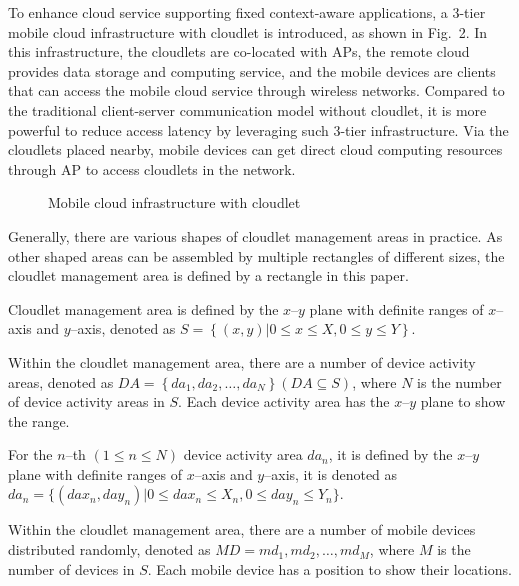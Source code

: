 \documentclass{llncs}
\begin{document}
To enhance cloud service supporting fixed context-aware applications, a 3-tier mobile cloud infrastructure with cloudlet is introduced, as shown in Fig.~2. In this infrastructure, the cloudlets are co-located with APs, the remote cloud provides data storage and computing service, and the mobile devices are clients that can access the mobile cloud service through wireless networks. Compared to the traditional client-server communication model \cite{lo:gao} without cloudlet, it is more powerful to reduce access latency by leveraging such 3-tier infrastructure. Via the cloudlets placed nearby, mobile devices can get direct cloud computing resources through AP to access cloudlets in the network.

\begin{figure}
\centering
{}
\caption{Mobile cloud infrastructure with cloudlet}
\end{figure}

Generally, there are various shapes of cloudlet management areas in practice. As other shaped areas can be assembled by multiple rectangles of different sizes, the cloudlet management area is defined by a rectangle in this paper.

\begin{definition}
Cloudlet management area is defined by the $x$--$y$ plane with definite ranges of $x$--axis and $y$--axis, denoted as $S = \left\{(x, y) |0 \leq x \leq X, 0 \leq y \leq Y\right\}$.
\end{definition}

Within the cloudlet management area, there are a number of device activity areas, denoted as $DA = \left\{da_{1}, da_{2},…, da_{N}\right\} (DA \subseteq S)$, where $N$ is the number of device activity areas in $S$. Each device activity area has the $x$--$y$ plane to show the range.

\begin{definition}
For the $n$--th $(1 \leq n \leq N)$ device activity area $da_{n}$, it is defined by the $x$--$y$ plane with definite ranges of $x$--axis and $y$--axis, it is denoted as $da_{n} = \{(dax_{n}, day_{n}) |0 \leq dax_{n} \leq X_{n}, 0 \leq day_{n} \leq Y_{n}\}$.
\end{definition}

Within the cloudlet management area, there are a number of mobile devices distributed randomly, denoted as $MD = {md_1, md_2,\dots, md_M}$, where $M$ is the number of devices in $S$. Each mobile device has a position to show their locations.
\end{document}
